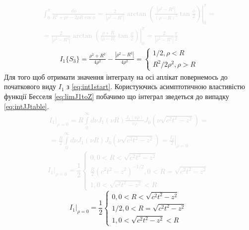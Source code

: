 %
\textcolor{lightgray}{ \begin{equation*} \begin{aligned}
\int_{0}^{\pi} \frac{d \phi}{R^2 + \rho^2 - 2 \rho R \cos \phi} =
\left. \frac{2}{ | \rho^2 - R^2 | } \arctan \left( \frac{ | \rho^2 - R^2 | }
{\left( \rho - R \right)^2} \tan \frac{\phi}{2} \right)
\right|_{0}^{\pi} = \\ = \frac{2}{ | \rho^2 - R^2 | } \left.
\arctan \left( \frac{\rho + R}{ | \rho - R | } \tan \frac{\phi}{2} \right)
\right|_{0}^{\pi} = \frac{2}{ | \rho^2 - R^2 | } \frac{\pi}{2}
\end{aligned} \end{equation*} }
%
\begin{equation*} \begin{aligned}
I_1 \{ S_3 \} = \frac{\rho^2 + R^2}{4 \rho^2} - 
\frac{ |\rho^2 - R^2| }{4 \rho^2} = \begin{cases}
1/2 , \rho < R \\
R^2 / 2 \rho^2, \rho > R
\end{cases}
\end{aligned} \end{equation*}
%
Для того щоб отримати значення інтегралу на осі аплікат повернемось до 
початкового виду $ I_1 $ з \eqref{eq:int1start}. Користуючись асимптотичною 
властивістю функції Бесселя \eqref{eq:limJ1toZ} побачимо що інтеграл 
зведеться до випадку \eqref{eq:intJJtable}.
%
\textcolor{lightgray} {\begin{equation*} \begin{aligned}
\left. I_1 \right|_{\rho = 0} = R \int\limits_{0}^{\infty} d \nu
J_1 \left( \nu R \right) \frac{J_1 \left( \nu \rho \right) }{\nu \rho}
J_0 \left( \nu \sqrt{c^2 t^2 - z^2} \right) = \\
= \frac{R}{2} \int\limits_{0}^{\infty} d \nu
J_1 \left( \nu R \right) J_0 \left( \nu \sqrt{c^2 t^2 - z^2} \right) = 
\left. \frac{I_2}{2} \right|_{\rho = 0}
\end{aligned} \end{equation*} }
%
\textcolor{lightgray} {\begin{equation*}
\left. I_1 \right|_{\rho = 0} = \frac{1}{2} \begin{cases}
0, 0 < R < \sqrt{c^2t^2 - z^2} \\
\frac{R}{2} \left( c^2t^2 - z^2 \right)^{-1/2}, 0 < R = \sqrt{c^2t^2 - z^2} \\ 
1, 0 < \sqrt{c^2t^2 - z^2} < R 
\end{cases}
\end{equation*} }
%
\begin{equation}
\left. I_1 \right|_{\rho = 0} = \frac{1}{2} \begin{cases}
0, 0 < R < \sqrt{c^2t^2 - z^2} \\
1/2, 0 < R = \sqrt{c^2t^2 - z^2} \\ 
1, 0 < \sqrt{c^2t^2 - z^2} < R 
\end{cases}
\end{equation}

